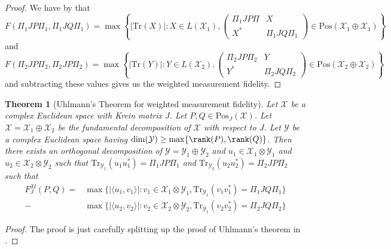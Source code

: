 \documentclass{amsart}
\numberwithin{equation}{section}
\newtheorem{theorem}{Theorem}[section]
\theoremstyle{definition}
\theoremstyle{plain}
\theoremstyle{solutionstyle}
\begin{document}
\begin{proof}\label{weighted measurement fidelity}
    We have by \citep[p.~144]{Watrous_2018} that 
    \begin{equation*}F(\Pi_1JP\Pi_1,\Pi_1JQ\Pi_1)=\max\left\{|\mathrm{Tr}(X)|:X\in L(\mathcal{X}_1), \begin{pmatrix}
        \Pi_1JP\Pi& X\\
        X^*& \Pi_1JQ\Pi_1
    \end{pmatrix}\in\mathrm{Pos}(\mathcal{X}_1\oplus\mathcal{X}_1)\right\}\end{equation*}
    and 
    \begin{equation*}F(\Pi_2JP\Pi_2,\Pi_2JP\Pi_2)=\max\left\{|\mathrm{Tr}(Y)|:Y\in L(\mathcal{X}_2), \begin{pmatrix}
        \Pi_2JP\Pi_2 & Y\\
        Y^* & \Pi_2JQ\Pi_2
    \end{pmatrix} \in \mathrm{Pos}(\mathcal{X}_2\oplus\mathcal{X}_2)\right\}\end{equation*}
    and subtracting these values gives us the weighted measurement fidelity.
\end{proof}
\begin{theorem}[Uhlmann's Theorem for weighted measurement fidelity]
Let $\mathcal{X}$ be a complex Euclidean space with Krein matrix $J$. Let $P,Q\in \mathrm{Pos}_J(\mathcal{X})$. Let $\mathcal{X}=\mathcal{X}_1\oplus\mathcal{X}_2$ be the fundamental decomposition of $\mathcal{X}$ with respect to $J$. Let $\mathcal{Y}$ be a complex Euclidean space having $\dim(\mathcal{Y})\geq \max\{\rank(P),\rank(Q)\}$. Then there exists an orthogonal decomposition of $\mathcal{Y}=\mathcal{Y}_1\oplus\mathcal{Y}_2$ and $u_1\in \mathcal{X}_1\otimes\mathcal{Y}_1$ and $u_2\in \mathcal{X}_2\otimes \mathcal{Y}_2$ such that $\mathrm{Tr}_{\mathcal{Y}_1}(u_1u_1^*)=\Pi_1JP\Pi_1$ and $\mathrm{Tr}_{\mathcal{Y}_2}(u_2u_2^*)=\Pi_2JP\Pi_2$ such that 
\begin{align*}
    F_J^M(P,Q)=&\max\{|\langle u_1,v_1\rangle|: v_1\in \mathcal{X}_1\otimes \mathcal{Y}_1, \mathrm{Tr}_{\mathcal{Y}_1}(v_1v_1^*)=\Pi_1JQ\Pi_1\}\\-&\max\{|\langle u_2,v_2\rangle|: v_2\in \mathcal{X}_2\otimes \mathcal{Y}_2,\mathrm{Tr}_{\mathcal{Y}_1}(v_2v_2^*)=\Pi_2JQ\Pi_2\}
\end{align*}
     
\end{theorem}
\begin{proof}
    The proof is just carefully splitting up the proof of Uhlmann's theorem in \citep[p.~151--152]{Watrous_2018}.
\end{proof}
\end{document}
